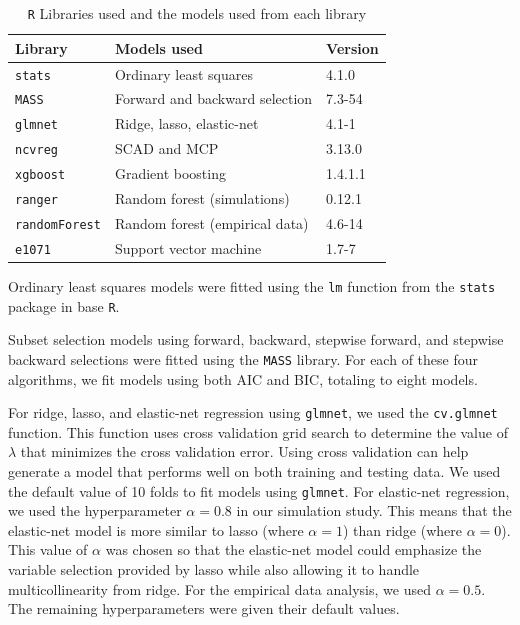 \documentclass{article}
\begin{document}
\begin{table}[h]
	\centering
	\caption{\lstinline!R! Libraries used and the models used from each library}
	\label{tab:model-libraries}
	\begin{tabular}{lll}\hline
		\textbf{Library}    	  & \textbf{Models used}                                 & \textbf{Version} \\ \hline
		\lstinline!stats! \cite{r}   	  & Ordinary least squares                               & 4.1.0            \\
		\lstinline!MASS! \cite{venables2002mass}   	  & Forward and backward selection                       & 7.3-54           \\
		\lstinline!glmnet! \cite{friedman2010regularization} 	  & Ridge, lasso, elastic-net                            & 4.1-1            \\
		\lstinline!ncvreg! \cite{breheny2011ncvreg}	      & SCAD and MCP                                         & 3.13.0           \\
		\lstinline!xgboost! \cite{chen2021xgboost}	  & Gradient boosting                                    & 1.4.1.1          \\
		\lstinline!ranger! \cite{wright2017ranger} 	  & Random forest (simulations)                          & 0.12.1           \\
		\lstinline!randomForest! \cite{liaw2002rf} & Random forest (empirical data)                       & 4.6-14           \\
		\lstinline!e1071! \cite{meyer2021e1071}  	  & Support vector machine                               & 1.7-7            \\\hline
	\end{tabular}
\end{table}

Ordinary least squares models were fitted using the \lstinline!lm! function from the \lstinline!stats! package in base \lstinline!R!.

Subset selection models using forward, backward, stepwise forward, and stepwise backward selections were fitted using the \lstinline!MASS! library. For each of these four algorithms, we fit models using both AIC and BIC, totaling to eight models.

For ridge, lasso, and elastic-net regression using \lstinline!glmnet!, we used the \lstinline!cv.glmnet! function. This function uses cross validation grid search to determine the value of $\lambda$ that minimizes the cross validation error. Using cross validation can help generate a model that performs well on both training and testing data. We used the default value of 10 folds to fit models using \lstinline!glmnet!. For elastic-net regression, we used the hyperparameter $\alpha = 0.8$ in our simulation study. This means that the elastic-net model is more similar to lasso (where $\alpha = 1$) than ridge (where $\alpha = 0$). This value of $\alpha$ was chosen so that the elastic-net model could emphasize the variable selection provided by lasso while also allowing it to handle multicollinearity from ridge. For the empirical data analysis, we used $\alpha = 0.5$. The remaining hyperparameters were given their default values.
\end{document}
